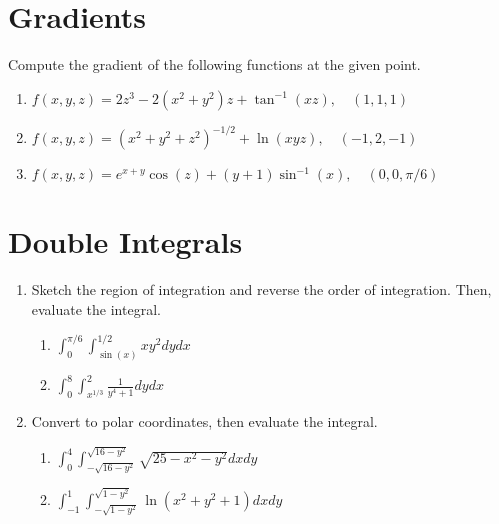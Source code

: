 \documentclass[letterpaper, 11pt]{article}
\begin{document}
\section{Gradients}
Compute the gradient of the following functions at the given point. 
\begin{enumerate}
\item $f(x,y,z) = 2z^3 - 2(x^2 + y^2)z + \tan^{-1}(xz),\quad (1,1,1)$

\item $f(x,y,z) = (x^2 + y^2 + z^2)^{-1/2} + \ln(xyz),\quad (-1,2,-1)$

\item $f(x,y,z) = e^{x + y}\cos(z) + (y + 1)\sin^{-1}(x), \quad (0,0,\pi/6)$

\end{enumerate}

\section{Double Integrals}

\begin{enumerate}
\item Sketch the region of integration and reverse the order of integration. Then, evaluate the integral.  
\begin{enumerate}[label=(\alph*)]
\item $\int_0^{\pi/6} \int_{\sin(x)}^{1/2} xy^2 dy dx$

\item $\int_0^8 \int_{x^{1/3}}^2 \frac{ 1}{y^4 + 1}dydx$

\end{enumerate}

\item Convert to polar coordinates, then evaluate the integral. 
\begin{enumerate}[label=(\alph*)]
\item $\int_0^4 \int_{-\sqrt{16-y^2}}^{\sqrt{16-y^2}} \sqrt{ 25 - x^2 - y^2} dx dy$

\item $\int_{-1}^1 \int_{-\sqrt{1 - y^2}}^{\sqrt{1 - y^2}} \ln(x^2 + y^2 + 1)dx dy$

\end{enumerate}

\end{enumerate}
\end{document}
